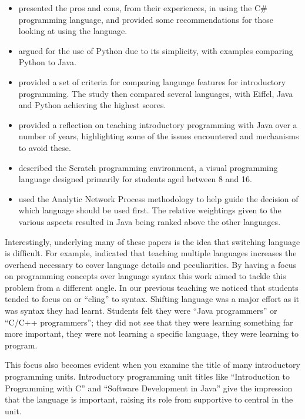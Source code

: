 \begin{itemize}[noitemsep,nolistsep]
	\item \citet{Bishop:2006} presented the pros and cons, from their experiences, in using the C\# programming language, and provided some recommendations for those looking at using the language.

	\item \citet{Mannila:2006} argued for the use of Python due to its simplicity, with examples comparing Python to Java.

	\item \citet{Mannila:2006a} provided a set of criteria for comparing language features for introductory programming. The study then compared several languages, with Eiffel, Java and Python achieving the highest scores.

	\item \citet{Pendergast:2006} provided a reflection on teaching introductory programming with Java over a number of years, highlighting some of the issues encountered and mechanisms to avoid these.

	\item \citet{Maloney:2010} described the Scratch programming environment, a visual programming language designed primarily for students aged between 8 and 16.

	\item \citet{Anik:2011} used the Analytic Network Process methodology to help guide the decision of which language should be used first. The relative weightings given to the various aspects resulted in Java being ranked above the other languages.
\end{itemize}

Interestingly, underlying many of these papers is the idea that switching language is difficult. For example, \citet{Brilliant:1996} indicated that teaching multiple languages increases the overhead necessary to cover language details and peculiarities. By having a focus on programming concepts over language syntax this work aimed to tackle this problem from a different angle. In our previous teaching we noticed that students tended to focus on or ``cling'' to syntax. Shifting language was a major effort as it was syntax they had learnt. Students felt they were ``Java programmers'' or ``C/C++ programmers''; they did not see that they were learning something far more important, they were not learning a specific language, they were learning to program. 

This focus also becomes evident when you examine the title of many introductory programming units. Introductory programming unit titles like ``Introduction to Programming with C'' and ``Software Development in Java'' give the impression that the language is important, raising its role from supportive to central in the unit.

